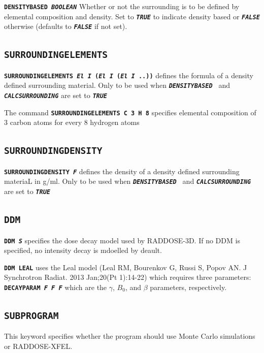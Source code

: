 \documentclass[a4paper]{article}
\newcommand{\Keyword}[1]{\texttt{\textbf{#1}}\xspace}
\newcommand{\SB}{\\[0.2em]}
\begin{document}
\noindent \Keyword{DENSITYBASED \textit{BOOLEAN}}
Whether or not the surrounding is to be defined by elemental composition and density. Set to \Keyword{\textit{TRUE}} to indicate density based or \Keyword{\textit{FALSE}} otherwise (defaults to \Keyword{\textit{FALSE}} if not set).

\subsection{\Keyword{SURROUNDINGELEMENTS}}
\label{surroundingelements}

\noindent \Keyword{SURROUNDINGELEMENTS  \textit{El I} (\textit{El I} (\textit{El I} ..))}
defines the formula of a density defined surrounding material. Only to be used when \Keyword{\textit{DENSITYBASED }} and \Keyword{\textit{CALCSURROUNDING}} are set to \Keyword{\textit{TRUE}}

The command \Keyword{SURROUNDINGELEMENTS C 3 H 8} specifies elemental composition of 3 carbon atoms for every 8 hydrogen atoms

\subsection{\Keyword{SURROUNDINGDENSITY}}
\label{surroundingdensity}
\noindent \Keyword{SURROUNDINGDENSITY \textit{F}}
defines the density of a density defined surrounding materiaL in g/ml. Only to be used when \Keyword{\textit{DENSITYBASED }} and \Keyword{\textit{CALCSURROUNDING}} are set to \Keyword{\textit{TRUE}}

\subsection{\Keyword{DDM}}
\label{DDM}
\noindent \Keyword{DDM \textit{S}}
specifies the dose decay model used by RADDOSE-3D.
If no DDM is specified, no intensity decay is mdoelled by deault.

\noindent \Keyword{DDM LEAL} uses the Leal model (Leal RM, Bourenkov G, Russi S, Popov AN. J Synchrotron Radiat. 2013 Jan;20(Pt 1):14-22) which requires three parameters:
\noindent \Keyword{DECAYPARAM \textit{F F F}}
which are the $\gamma$, $B_0$, and $\beta$ parameters, respectively.

\newpage
\subsection{\Keyword{SUBPROGRAM}}
\label{subprogram}
This keyword specifies whether the program should use Monte Carlo simulations or RADDOSE-XFEL.\SB
\end{document}
